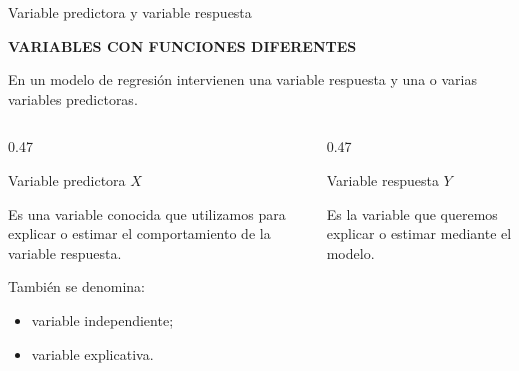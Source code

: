 \documentclass[aspectratio=169,11pt]{beamer}
\newcommand{\kicker}[1]{%
  {\scriptsize\bfseries\color{cAcc}\MakeUppercase{#1}}%
  \par\vspace{0.2em}%
}
\newenvironment{cerrado}[1]
  {\begin{block}{#1}
   \begin{minipage}{\linewidth}
   \raggedright}
  {\end{minipage}
   \end{block}}
\begin{document}

\begin{frame}{Variable predictora y variable respuesta}

  \begin{center}
    \begin{minipage}{0.90\textwidth}

      \kicker{VARIABLES CON FUNCIONES DIFERENTES}

      \vspace{0.4em}

      En un modelo de regresión intervienen una variable respuesta
      y una o varias variables predictoras.

      \vspace{0.6em}

      \begin{columns}[T,onlytextwidth]

        \begin{column}{0.47\textwidth}

          \begin{cerrado}{Variable predictora \(X\)}

            Es una variable conocida que utilizamos para explicar
            o estimar el comportamiento de la variable respuesta.

            \vspace{0.4em}

            También se denomina:

            \begin{itemize}
              \item variable independiente;
              \item variable explicativa.
            \end{itemize}

          \end{cerrado}

        \end{column}

        \begin{column}{0.47\textwidth}

          \begin{cerrado}{Variable respuesta \(Y\)}

            Es la variable que queremos explicar o estimar mediante
            el modelo.


\end{cerrado}
\end{column}
\end{columns}
\end{minipage}
\end{center}
\end{frame}
\end{document}
